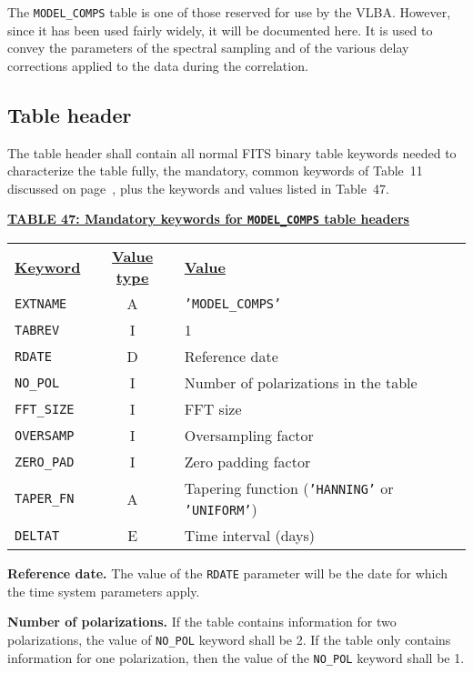 \documentclass[twoside]{article}
\newcommand{\Me}[1]{\textcolor{mecol}{#1}}
\begin{document}
The {\tt MODEL\_COMPS} table is one of those reserved for use by the
VLBA\@.  However, since it has been used fairly widely, it will be
documented here.  It is used to convey the parameters of the spectral
sampling and of the various delay corrections applied to the data
during the correlation.

\subsection{Table header}

The table header shall contain all normal FITS binary table keywords
needed to characterize the table fully, the mandatory, common keywords
of Table~11 discussed on page~\pageref{ta:keywords}, plus the keywords
and values listed in Table~47.

\begin{center}
\underline{\bf{TABLE 47: Mandatory keywords for {\tt MODEL\_COMPS} table
    headers}}\\
\begin{tabular}{lcl}
\noalign{\vspace{2pt}}
\underline{{\bf Keyword}} & \underline{\bf{Value type}} &
    \underline{\bf{Value\vphantom{y}}} \\
\noalign{\vspace{2pt}}
{\tt EXTNAME}   & A & {\tt 'MODEL\_COMPS'}  \\
{\tt TABREV}    & I & 1 \\
{\tt RDATE}     & D & Reference date \\
{\tt NO\_POL}   & I & Number of polarizations in the table \\
{\tt FFT\_SIZE} & I & FFT size \\
{\tt OVERSAMP}  & I & Oversampling factor \\
{\tt ZERO\_PAD} & I & Zero padding factor \\
{\tt TAPER\_FN} & A & Tapering function ({\tt 'HANNING'} or {\tt
                      'UNIFORM'}) \\
{\tt \Me{DELTAT}} & \Me{E} & \Me{Time interval (days)}
\end{tabular}
\end{center}

{\bf Reference date.} The value of the {\tt RDATE} parameter will be
the date for which the time system parameters apply.

{\bf Number of polarizations.}  If the table contains information for
two polarizations, the value of {\tt NO\_POL} keyword shall be 2.  If
the table only contains information for one polarization, then the
value of the {\tt NO\_POL} keyword shall be 1.
\end{document}
